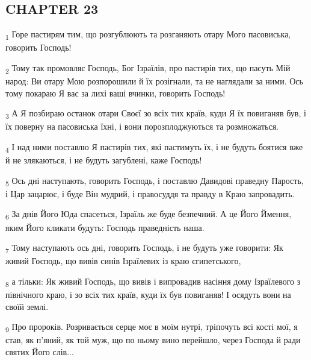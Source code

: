\subsection{CHAPTER 23}
\begin{tcolorbox}
\textsubscript{1} Горе пастирям тим, що розгублюють та розганяють отару Мого пасовиська, говорить Господь!
\end{tcolorbox}
\begin{tcolorbox}
\textsubscript{2} Тому так промовляє Господь, Бог Ізраїлів, про пастирів тих, що пасуть Мій народ: Ви отару Мою розпорошили й їх розігнали, та не наглядали за ними. Ось тому покараю Я вас за лихі ваші вчинки, говорить Господь!
\end{tcolorbox}
\begin{tcolorbox}
\textsubscript{3} А Я позбираю останок отари Своєї зо всіх тих країв, куди Я їх повиганяв був, і їх поверну на пасовиська їхні, і вони порозплоджуються та розмножаться.
\end{tcolorbox}
\begin{tcolorbox}
\textsubscript{4} І над ними поставлю Я пастирів тих, які пастимуть їх, і не будуть боятися вже й не злякаються, і не будуть загублені, каже Господь!
\end{tcolorbox}
\begin{tcolorbox}
\textsubscript{5} Ось дні наступають, говорить Господь, і поставлю Давидові праведну Парость, і Цар зацарює, і буде Він мудрий, і правосуддя та правду в Краю запровадить.
\end{tcolorbox}
\begin{tcolorbox}
\textsubscript{6} За днів Його Юда спасеться, Ізраїль же буде безпечний. А це Його Ймення, яким Його кликати будуть: Господь праведність наша.
\end{tcolorbox}
\begin{tcolorbox}
\textsubscript{7} Тому наступають ось дні, говорить Господь, і не будуть уже говорити: Як живий Господь, що вивів синів Ізраїлевих із краю єгипетського,
\end{tcolorbox}
\begin{tcolorbox}
\textsubscript{8} а тільки: Як живий Господь, що вивів і випровадив насіння дому Ізраїлевого з північного краю, і зо всіх тих країв, куди їх був повиганяв! І осядуть вони на своїй землі.
\end{tcolorbox}
\begin{tcolorbox}
\textsubscript{9} Про пророків. Розривається серце моє в моїм нутрі, тріпочуть всі кості мої, я став, як п'яний, як той муж, що по ньому вино перейшло, через Господа й ради святих Його слів...
\end{tcolorbox}
